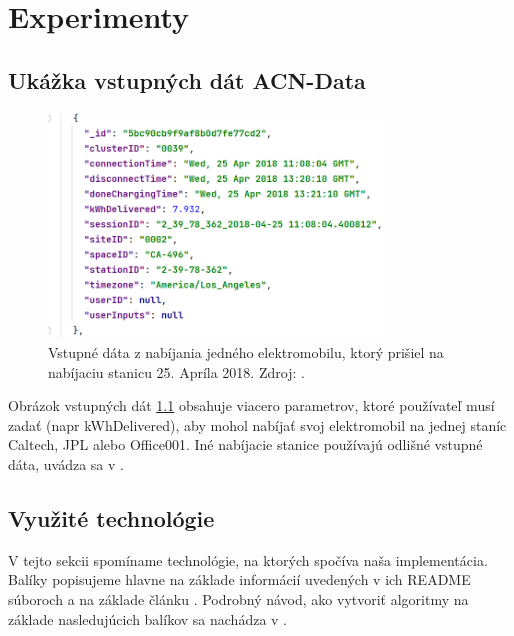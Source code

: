 \chapter{Experimenty}

\section{Ukážka vstupných dát ACN-Data}
\begin{figure}[H]
    \includegraphics[width=0.8\textwidth]{images/acndata.png}
    \centering
    \caption[Ukážka vstupných dát ACN-Data]{Vstupné dáta z nabíjania jedného elektromobilu, ktorý prišiel na nabíjaciu stanicu 25. Apríla 2018. Zdroj: \cite{websiteacndata2023}.}
    \label{acndata:obr}
    \end{figure}
Obrázok vstupných dát \ref{acndata:obr} obsahuje viacero parametrov, ktoré používateľ musí zadať (napr kWhDelivered), aby mohol nabíjať svoj elektromobil na jednej staníc Caltech, JPL alebo Office001. Iné nabíjacie stanice používajú odlišné vstupné dáta, uvádza sa v \cite{lee2021adaptivephd}.

\section{Využité technológie}
V tejto sekcii spomíname technológie, na ktorých spočíva naša implementácia. Balíky popisujeme hlavne na základe informácií uvedených v ich README súboroch a na základe článku \cite{lee2021acnsim}. Podrobný návod, ako vytvoriť algoritmy na základe nasledujúcich balíkov sa nachádza v \cite{lee2021acnsim}.
\label{vychodiska:technologicke}


